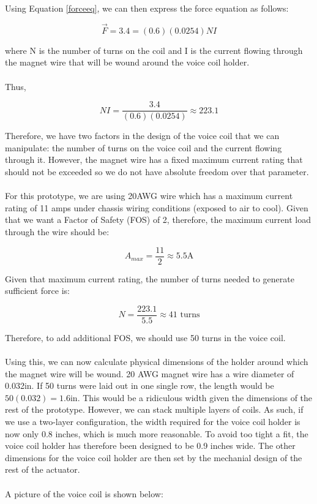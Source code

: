 \noindent Using Equation \ref{forceeq}, we can then express the force equation as follows:

\begin{equation}
\vec{F}=3.4 = (0.6)(0.0254)NI
\end{equation}

\noindent where N is the number of turns on the coil and I is the current flowing through the magnet wire that will be wound around the voice coil holder. \\ \\
%
Thus,

\begin{equation}
NI=\frac{3.4}{(0.6)(0.0254)} \approx 223.1
\end{equation}

\noindent Therefore, we have two factors in the design of the voice coil that we can manipulate: the number of turns on the voice coil and the current flowing through it. However, the magnet wire has a fixed maximum current rating that should not be exceeded so we do not have absolute freedom over that parameter. \\ \\
%
For this prototype, we are using 20AWG wire which has a maximum current rating of 11 amps under chassis wiring conditions (exposed to air to cool). Given that we want a Factor of Safety (FOS) of 2, therefore, the maximum current load through the wire should be:

\begin{equation}
A_{max}=\frac{11}{2} \approx 5.5\mbox{A}
\end{equation}

\noindent Given that maximum current rating, the number of turns needed to generate sufficient force is: 

\begin{equation}
N=\frac{223.1}{5.5} \approx 41 \mbox{ turns}
\end{equation}

\noindent Therefore, to add additional FOS, we should use 50 turns in the voice coil. \\ \\
%
Using this, we can now calculate physical dimensions of the holder around which the magnet wire will be wound. 20 AWG magnet wire has a wire diameter of 0.032in. If 50 turns were laid out in one single row, the length would be $50(0.032) = 1.6\mbox{in}$. This would be a ridiculous width given the dimensions of the rest of the prototype. However, we can stack multiple layers of coils. As such, if we use a two-layer configuration, the width required for the voice coil holder is now only 0.8 inches, which is much more reasonable. To avoid too tight a fit, the voice coil holder has therefore been designed to be 0.9 inches wide. The other dimensions for the voice coil holder are then set by the mechanial design of the rest of the actuator. \\ \\
%
A picture of the voice coil is shown below:

